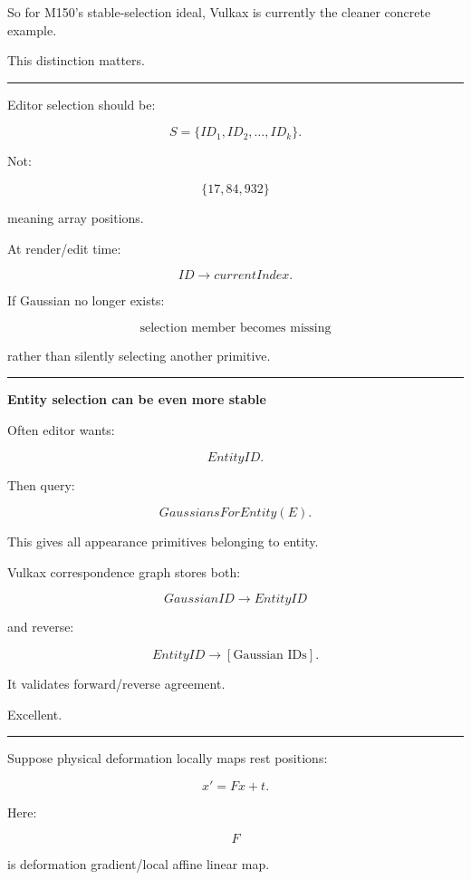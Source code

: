 So for M150's stable-selection ideal, Vulkax is currently the cleaner concrete example.

This distinction matters.

\begin{center}\rule{0.5\linewidth}{0.5pt}\end{center}

Editor selection should be:

\[
\boxed{
S=
\{ID_1,ID_2,\dots,ID_k\}.
}
\]

Not:

\[
\{17,84,932\}
\]

meaning array positions.

At render/edit time:

\[
ID
\rightarrow
currentIndex.
\]

If Gaussian no longer exists:

\[
\boxed{
\text{selection member becomes missing}
}
\]

rather than silently selecting another primitive.

\begin{center}\rule{0.5\linewidth}{0.5pt}\end{center}

\textbf{Entity selection can be even more stable}

Often editor wants:

\[
EntityID.
\]

Then query:

\[
GaussiansForEntity(E).
\]

This gives all appearance primitives belonging to entity.

Vulkax correspondence graph stores both:

\[
GaussianID\rightarrow EntityID
\]

and reverse:

\[
EntityID\rightarrow
[\text{Gaussian IDs}].
\]

It validates forward/reverse agreement.

Excellent.

\begin{center}\rule{0.5\linewidth}{0.5pt}\end{center}

Suppose physical deformation locally maps rest positions:

\[
x'
=
F x+t.
\]

Here:

\[
F
\]

is deformation gradient/local affine linear map.

